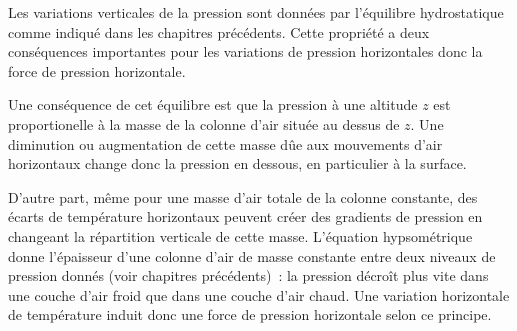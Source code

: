 
\sk
Les variations verticales de la pression sont données par l'équilibre hydrostatique comme indiqué dans les chapitres précédents. Cette propriété a deux conséquences importantes pour les variations de pression horizontales donc la force de pression horizontale. 
\begin{finger}
\item Une conséquence de cet équilibre est que la pression à une altitude $z$ est proportionelle à la masse de la colonne d'air située au dessus de $z$. Une diminution ou augmentation de cette masse dûe aux mouvements d'air horizontaux change donc la pression en dessous, en particulier à la surface.
\item D'autre part, même pour une masse d'air totale de la colonne constante, des écarts de température horizontaux peuvent créer des gradients de pression en changeant la répartition verticale de cette masse. L'équation hypsométrique donne l'épaisseur d'une colonne d'air de masse constante entre deux niveaux de pression donnés (voir chapitres précédents)~: la pression décroît plus vite dans une couche d'air froid que dans une couche d'air chaud. Une variation horizontale de température induit donc une force de pression horizontale selon ce principe.
\end{finger}

